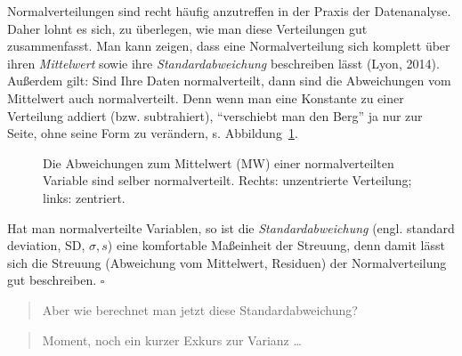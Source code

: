 \documentclass[
  letterpaper,
]{scrbook}
\theoremstyle{definition}
\theoremstyle{definition}
\theoremstyle{definition}
\theoremstyle{remark}
\begin{document}
Normalverteilungen sind recht häufig anzutreffen in der Praxis der
Datenanalyse. Daher lohnt es sich, zu überlegen, wie man diese
Verteilungen gut zusammenfasst. Man kann zeigen, dass eine
Normalverteilung sich komplett über ihren \emph{Mittelwert} sowie ihre
\emph{Standardabweichung} beschreiben lässt (Lyon, 2014). Außerdem gilt:
Sind Ihre Daten normalverteilt, dann sind die Abweichungen vom
Mittelwert auch normalverteilt. Denn wenn man eine Konstante zu einer
Verteilung addiert (bzw. subtrahiert), \enquote{verschiebt man den Berg}
ja nur zur Seite, ohne seine Form zu verändern, s.
Abbildung~\ref{fig-norm-dev}.

\begin{figure}


\caption{\label{fig-norm-dev}Die Abweichungen zum Mittelwert (MW) einer
normalverteilten Variable sind selber normalverteilt. Rechts:
unzentrierte Verteilung; links: zentriert.}

\end{figure}%

Hat man normalverteilte Variablen, so ist die \emph{Standardabweichung}
(engl. standard deviation, SD, \(\sigma, s\)) eine komfortable
Maßeinheit der Streuung, denn damit lässt sich die Streuung (Abweichung
vom Mittelwert, Residuen) der Normalverteilung gut beschreiben.
\(\square\)

\begin{quote}
{} Aber wie berechnet man jetzt diese Standardabweichung?
\end{quote}

\begin{quote}
{} Moment, noch ein kurzer Exkurs zur Varianz \ldots{}
\end{quote}
\end{document}
